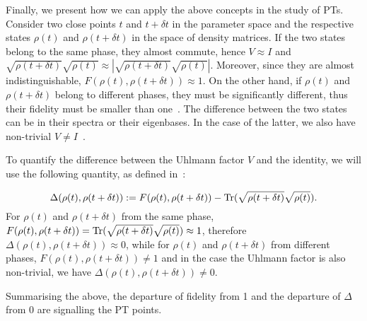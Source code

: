 Finally, we present how we can apply the above concepts in the study of PTs. Consider two close points $t$ and $t+\delta t$ in the parameter space and  the respective states $\rho(t)$ and $\rho(t+\delta t)$ in the space of density matrices. If the two states belong to the same phase, they almost commute, hence $V\approx I$ and $\sqrt{\rho(t+\delta t)}\sqrt{\rho(t)}\approx|\sqrt{\rho(t+\delta t)}\sqrt{\rho(t)}|$. Moreover, since they are almost indistinguishable, $F(\rho(t),\rho(t+\delta t))\approx 1$. On the other hand, if $\rho(t)$ and $\rho(t+\delta t)$ belong to different phases, they must be significantly different, thus their fidelity must be smaller than one~\cite{zan:pau:06}. The difference between the two states can be in their spectra or their eigenbases. In the case of the latter, we also have non-trivial $V\neq I$~\cite{pau:vie:08}.

To quantify the difference between the Uhlmann factor $V$ and the identity, we will use the following quantity, as defined in~\cite{pau:vie:08}:

\begin{equation} 
\Delta(\rho(t),\rho(t+\delta t)):=  F(\rho(t),\rho(t+\delta t))- \text{Tr}(\sqrt{\rho(t+\delta t)}\sqrt{\rho(t)}).
\end{equation}
For $\rho(t)$ and $\rho(t+\delta t)$ from the same phase, $F(\rho(t),\rho(t+\delta t))=\text{Tr}(\sqrt{\rho(t+\delta t)}\sqrt{\rho(t)})\approx 1$, therefore $\Delta(\rho(t),\rho(t+\delta t))\approx 0$, while for $\rho(t)$ and $\rho(t+\delta t)$ from different phases, $F(\rho(t),\rho(t+\delta t))\neq 1$ and in the case the Uhlmann factor is also non-trivial, we have $\Delta(\rho(t),\rho(t+\delta t))\neq0$.

Summarising the above, the departure of fidelity from 1 and the departure of $\Delta$ from 0 are signalling the PT points. 


